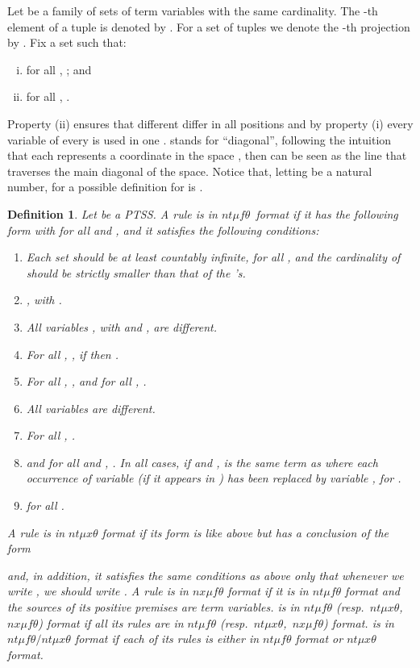 \documentclass[submission,copyright,creativecommons]{eptcs}
\newtheorem{definition}{Definition}
\newcommand{\ntmuft}{\ensuremath{\textit{nt}\mu\textit{f}\theta}}
\newcommand{\ntmuxt}{\ensuremath{\textit{nt}\mu\textit{x}\theta}}
\newcommand{\ntmufxt}{\ensuremath{\ntmuft\textit{/}\ntmuxt}}
\newcommand{\nxmuft}{\ensuremath{\textit{nx}\mu\textit{f}\theta}}
\newcommand{\colorpar}[3]{\colorbox{#1}{\parbox{#2}{#3}}}
\newcommand{\marginremark}[3]{\marginpar{\colorpar{#2}{\linewidth}{\color{#1}#3}}}
\newcommand{\remarkPRD}[1]{\marginremark{darkred}{lightred}{\tiny{[PRD]~ #1}}}
\renewcommand{\remarkPRD}[1]{}
\begin{document}
Let  be a family of sets of term variables with the same cardinality.
The -th element of a tuple   is denoted by .  For a set of
tuples  we denote the -th projection by 
.
Fix a set  such that:
\begin{enumerate}[(i)]
\item for all , ; and
\item for all , .
\end{enumerate}
Property (ii) ensures that different  differ in all positions and by property (i) every variable of every  is used in one .
 stands for ``diagonal'', following the intuition that each
 represents a coordinate in the space ,
then  can be seen as the line that traverses
the main diagonal of the space.
Notice that, letting  be a natural number,  for  a possible
definition for  is .

\begin{definition} \label{def:ntmufxnu}
  Let  be a PTSS.
A rule  is in \emph{\ntmuft\ format} 
  if it has the following form 
with 
  for all  and , and it satisfies the following conditions:
\begin{enumerate}
  \item\label{item:conditions_on_cardinality}Each set  should be at least countably infinite, for all
    , and the cardinality of  should be strictly smaller
    than that of the 's.
  \item\label{item:condition_on_Z}, with 
    .
\item\label{item:condition_mus_are_different}All variables , with  and
    , are different.
\remarkPRD{Notice that there is one item less thanks to the removal of the 's in the 's and a simplification of items~\ref{item:conditions_on_nonrepeating_z}, \ref{item:conditions_on_variables_of_theta}, and \ref{item:conditions_on_distribution_terms}.}
\item\label{item:conditions_on_nonrepeating_z}For all , , if 
    then .
  \item\label{item:conditions_on_Y}For all ,
    , and  for all , .
\item\label{item:conditions_on_z}All variables  are different.
\item\label{item:conditions_on_variables_of_theta}For all ,
    .
\item\label{item:conditions_on_terms} and for all  and , .  In all cases, if  and ,  is the same
    term as  where each occurrence of variable  (if it appears
    in ) has been replaced by variable , for .
\item\label{item:conditions_on_distribution_terms} for all .
\end{enumerate}
A rule  is in \emph{\ntmuxt{} format} if its form is like above
  but has a conclusion of the form

  and, in addition,
  it satisfies the same conditions as above only that whenever we write , we should write .
A rule  is in \emph{\nxmuft{} format} if it is in 
  \ntmuft{} format and the sources of its positive premises are term variables.
 is in \ntmuft{} (resp.\ \emph{\ntmuxt{}},\ \emph{\nxmuft{}}) \emph{format}
  if all its rules are in \ntmuft{} (resp.\ \ntmuxt{},\ \nxmuft{}) format.
 is in \emph{\ntmufxt{} format} if each of its rules is either in
  \ntmuft{} format or \ntmuxt{} format.
\end{definition}
\end{document}

